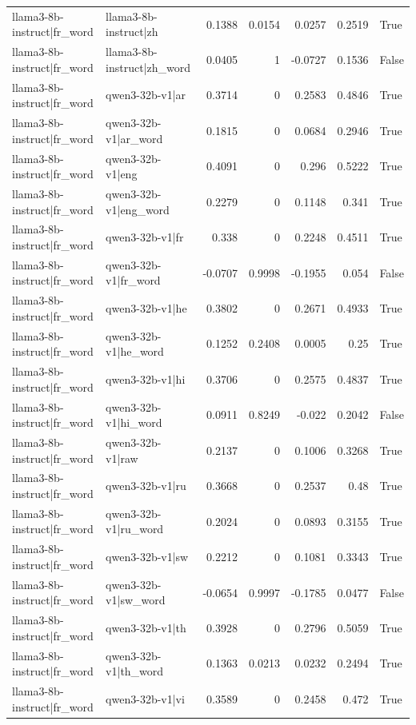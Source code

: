 \begin{table}
\begin{tabular}{l l r r r r l}
llama3-8b-instruct|fr_word & llama3-8b-instruct|zh & 0.1388 & 0.0154 & 0.0257 & 0.2519 & True \\
llama3-8b-instruct|fr_word & llama3-8b-instruct|zh_word & 0.0405 & 1 & -0.0727 & 0.1536 & False \\
llama3-8b-instruct|fr_word & qwen3-32b-v1|ar & 0.3714 & 0 & 0.2583 & 0.4846 & True \\
llama3-8b-instruct|fr_word & qwen3-32b-v1|ar_word & 0.1815 & 0 & 0.0684 & 0.2946 & True \\
llama3-8b-instruct|fr_word & qwen3-32b-v1|eng & 0.4091 & 0 & 0.296 & 0.5222 & True \\
llama3-8b-instruct|fr_word & qwen3-32b-v1|eng_word & 0.2279 & 0 & 0.1148 & 0.341 & True \\
llama3-8b-instruct|fr_word & qwen3-32b-v1|fr & 0.338 & 0 & 0.2248 & 0.4511 & True \\
llama3-8b-instruct|fr_word & qwen3-32b-v1|fr_word & -0.0707 & 0.9998 & -0.1955 & 0.054 & False \\
llama3-8b-instruct|fr_word & qwen3-32b-v1|he & 0.3802 & 0 & 0.2671 & 0.4933 & True \\
llama3-8b-instruct|fr_word & qwen3-32b-v1|he_word & 0.1252 & 0.2408 & 0.0005 & 0.25 & True \\
llama3-8b-instruct|fr_word & qwen3-32b-v1|hi & 0.3706 & 0 & 0.2575 & 0.4837 & True \\
llama3-8b-instruct|fr_word & qwen3-32b-v1|hi_word & 0.0911 & 0.8249 & -0.022 & 0.2042 & False \\
llama3-8b-instruct|fr_word & qwen3-32b-v1|raw & 0.2137 & 0 & 0.1006 & 0.3268 & True \\
llama3-8b-instruct|fr_word & qwen3-32b-v1|ru & 0.3668 & 0 & 0.2537 & 0.48 & True \\
llama3-8b-instruct|fr_word & qwen3-32b-v1|ru_word & 0.2024 & 0 & 0.0893 & 0.3155 & True \\
llama3-8b-instruct|fr_word & qwen3-32b-v1|sw & 0.2212 & 0 & 0.1081 & 0.3343 & True \\
llama3-8b-instruct|fr_word & qwen3-32b-v1|sw_word & -0.0654 & 0.9997 & -0.1785 & 0.0477 & False \\
llama3-8b-instruct|fr_word & qwen3-32b-v1|th & 0.3928 & 0 & 0.2796 & 0.5059 & True \\
llama3-8b-instruct|fr_word & qwen3-32b-v1|th_word & 0.1363 & 0.0213 & 0.0232 & 0.2494 & True \\
llama3-8b-instruct|fr_word & qwen3-32b-v1|vi & 0.3589 & 0 & 0.2458 & 0.472 & True \\

\end{tabular}
\end{table}
